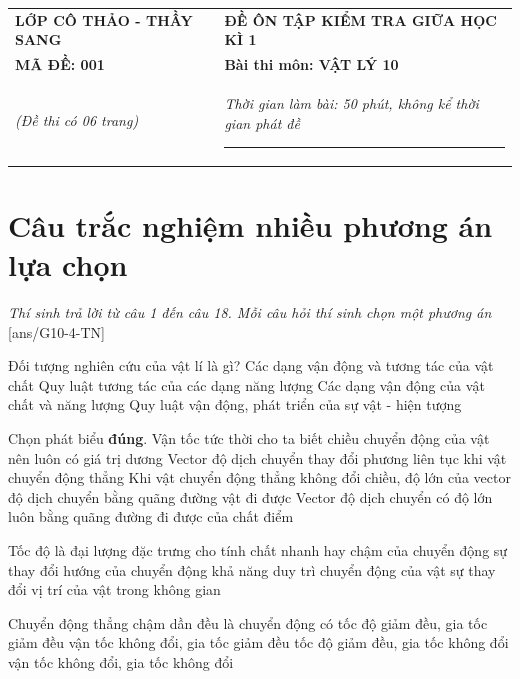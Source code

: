 \begin{tabular}{M{6.5cm}M{11cm}}
	\textbf{LỚP CÔ THẢO - THẦY SANG}& \textbf{ĐỀ ÔN TẬP KIỂM TRA GIỮA HỌC KÌ 1}\\
	\textbf{MÃ ĐỀ: 001}& \textbf{Bài thi môn: VẬT LÝ 10}\\
	\textit{(Đề thi có 06 trang)}& \textit{Thời gian làm bài: 50 phút, không kể thời gian phát đề}
	
	\noindent\rule{4cm}{0.8pt} \\
\end{tabular}
\setcounter{section}{0}
\section{Câu trắc nghiệm nhiều phương án lựa chọn}
\textit{Thí sinh trả lời từ câu 1 đến câu 18. Mỗi câu hỏi thí sinh chọn một phương án}
\setcounter{ex}{0}
[ans/G10-4-TN]
\begin{ex}
	Đối tượng nghiên cứu của vật lí là gì?
	\choice
	{Các dạng vận động và tương tác của vật chất}
	{Quy luật tương tác của các dạng năng lượng}
	{\True Các dạng vận động của vật chất và năng lượng}
	{Quy luật vận động, phát triển của sự vật - hiện tượng}
	\loigiai{}
\end{ex}
\begin{ex}
	Chọn phát biểu \textbf{đúng}.
	\choice
	{Vận tốc tức thời cho ta biết chiều chuyển động của vật nên luôn có giá trị dương}
	{Vector độ dịch chuyển thay đổi phương liên tục khi vật chuyển động thẳng}
	{\True Khi vật chuyển động thẳng không đổi chiều, độ lớn của vector độ dịch chuyển bằng quãng đường vật đi được}
	{Vector độ dịch chuyển có độ lớn luôn bằng quãng đường đi được của chất điểm}
	\loigiai{}
\end{ex}
\begin{ex}
	Tốc độ là đại lượng đặc trưng cho
	\choice
	{\True tính chất nhanh hay chậm của chuyển động}
	{sự thay đổi hướng của chuyển động}
	{khả năng duy trì chuyển động của vật}
	{sự thay đổi vị trí của vật trong không gian}
	\loigiai{}
\end{ex}
\begin{ex}
	Chuyển động thẳng chậm dần đều là chuyển động có
	\choice
	{tốc độ giảm đều, gia tốc giảm đều}
	{vận tốc không đổi, gia tốc giảm đều}
	{\True tốc độ giảm đều, gia tốc không đổi}
	{vận tốc không đổi, gia tốc không đổi}
	\loigiai{}
\end{ex}
